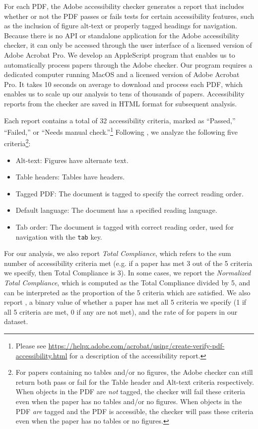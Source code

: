 For each PDF, the Adobe accessibility checker generates a report that includes whether or not the PDF passes or fails tests for certain accessibility features, such as the inclusion of figure alt-text or properly tagged headings for navigation. Because there is no API or standalone application for the Adobe accessibility checker, it can only be accessed through the user interface of a licensed version of Adobe Acrobat Pro. We develop an AppleScript program that enables us to automatically process papers through the Adobe checker. Our program requires a dedicated computer running MacOS and a licensed version of Adobe Acrobat Pro. It takes 10 seconds on average to download and process each PDF, which enables us to scale up our analysis to tens of thousands of papers. Accessibility reports from the checker are saved in HTML format for subsequent analysis.

Each report contains a total of 32 accessibility criteria, marked as ``Passed,'' ``Failed,'' or ``Needs manual check.''\footnote{Please see \href{https://helpx.adobe.com/acrobat/using/create-verify-pdf-accessibility.html}{https://helpx.adobe.com/acrobat/using/create-verify-pdf-accessibility.html} for a description of the accessibility report.}
Following \citet{Lazar2017MakingTF}, we analyze the following five criteria\footnote{For papers containing no tables and/or no figures, the Adobe checker can still return both pass or fail for the Table header and Alt-text criteria respectively. When objects in the PDF are \textit{not} tagged, the checker will fail these criteria even when the paper has no tables and/or no figures. When objects in the PDF \textit{are} tagged and the PDF is accessible, the checker will pass these criteria even when the paper has no tables or no figures.}:

\begin{itemize}
    \item Alt-text: Figures have alternate text.
    \item Table headers: Tables have headers.
    \item Tagged PDF: The document is tagged to specify the correct reading order.
    \item Default language: The document has a specified reading language.
    \item Tab order: The document is tagged with correct reading order, used for navigation with the \texttt{tab} key.
\end{itemize}

\noindent 
For our analysis, we also report \textit{Total Compliance}, which refers to the sum number of accessibility criteria met (e.g. if a paper has met 3 out of the 5 criteria we specify, then Total Compliance is 3). In some cases, we report the \textit{Normalized Total Compliance}, which is computed as the Total Compliance divided by 5, and can be interpreted as the proportion of the 5 criteria which are satisfied. We also report \textit{}, a binary value of whether a paper has met all 5 criteria we specify (1 if all 5 criteria are met, 0 if any are not met), and the rate of  for papers in our dataset.

